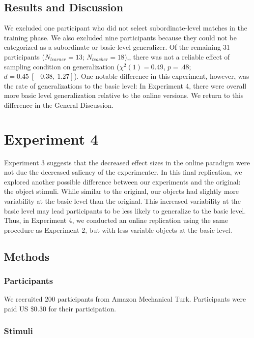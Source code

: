 \documentclass[man]{apa2}
\begin{document}
\subsection{Results and Discussion}
We excluded one participant who did not select subordinate-level matches in the training phase.  We also excluded nine participants because they could not be categorized as a subordinate or basic-level generalizer. Of the remaining 31 participants ($N_{learner} = 13$; $N_{teacher} = 18$),, there was not a reliable effect of sampling condition on generalization ($\chi^2(1) = 0.49$,  $p = .48$; $d = 0.45\ [-0.38,\ 1.27]$). One notable difference in this experiment, however, was the rate of generalizations to the basic level: In Experiment 4, there were overall more basic level generalization relative to the online versions. We return to this difference in the General Discussion.

\section{Experiment 4}

Experiment 3 suggests that the decreased effect sizes in the online paradigm were not due the decreased saliency of the experimenter. In this final replication, we explored another possible difference between our experiments and the original: the object stimuli. While similar to the original, our objects had slightly more variability at the basic level than the original. This increased variability at the basic level may lead participants to be less likely to generalize to the basic level. Thus, in Experiment 4, we conducted an online replication using the same procedure as Experiment 2, but with less variable objects at the basic-level. 

\subsection{Methods}

\subsubsection{Participants}   We recruited 200 participants from Amazon Mechanical Turk. Participants were paid US \$0.30 for their participation.

\subsubsection{Stimuli}
\end{document}
